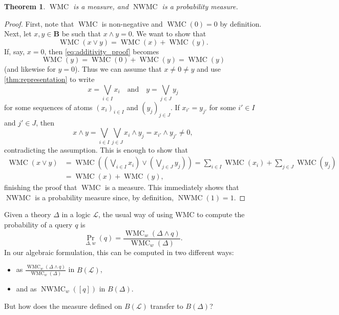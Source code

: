 \documentclass{article}
\newtheorem{theorem}{Theorem}
\theoremstyle{definition}
\theoremstyle{remark}
\DeclareMathOperator{\WMC}{WMC}
\DeclareMathOperator{\nWMC}{NWMC}
\begin{document}
\begin{theorem}
  $\WMC$ is a measure, and $\nWMC$ is a probability measure.
\end{theorem}
\begin{proof}
  First, note that $\WMC$ is non-negative and $\WMC(0) = 0$ by definition. Next,
  let $x, y \in \mathbf{B}$ be such that $x \land y = 0$. We want to show that
  \begin{equation} \label{eq:additivity_proof}
    \WMC(x \lor y) = \WMC(x) + \WMC(y).
  \end{equation}
  If, say, $x = 0$, then \cref{eq:additivity_proof} becomes
  \[
    \WMC(y) = \WMC(0) + \WMC(y) = \WMC(y)
  \]
  (and likewise for $y = 0$). Thus we can assume that $x \ne 0 \ne y$ and use
  \cref{thm:representation} to write
  \[
    x = \bigvee_{i \in I} x_i \quad \text{and} \quad y = \bigvee_{j \in J} y_j
  \]
  for some sequences of atoms $(x_i)_{i \in I}$ and $(y_j)_{j \in J}$. If
  $x_{i'} = y_{j'}$ for some $i' \in I$ and $j' \in J$, then
  \[
    x \land y = \bigvee_{i \in I} \bigvee_{j \in J} x_i \land y_j = x_{i'} \land
    y_{j'} \ne 0,
  \]
  contradicting the assumption. This is enough to show that
  \begin{align*}
    \WMC(x \lor y) &= \WMC\left( \left( \bigvee_{i \in I} x_i \right) \lor \left(\bigvee_{j \in J} y_j \right) \right) = \sum_{i \in I} \WMC(x_i) + \sum_{j \in J} \WMC(y_j) \\
                   &= \WMC(x) + \WMC(y),
  \end{align*}
  finishing the proof that $\WMC$ is a measure. This immediately shows that
  $\nWMC$ is a probability measure since, by definition, $\nWMC(1) = 1$.
\end{proof}

Given a theory $\Delta$ in a logic $\mathcal{L}$, the usual way of using WMC to
compute the probability of a query $q$ is
\cite{DBLP:conf/uai/Belle17,DBLP:conf/aaai/SangBK05}
\[
  \Pr_{\Delta, w}(q) = \frac{\WMC_w(\Delta \land q)}{\WMC_w(\Delta)}.
\]
In our algebraic formulation, this can be computed in two different ways:
\begin{itemize}
\item as $\frac{\WMC_w(\Delta \land q)}{\WMC_w(\Delta)}$ in $B(\mathcal{L})$,
\item and as $\nWMC_w([q])$ in $B(\Delta)$.
\end{itemize}
But how does the measure defined on $B(\mathcal{L})$ transfer to $B(\Delta)$?
\end{document}
